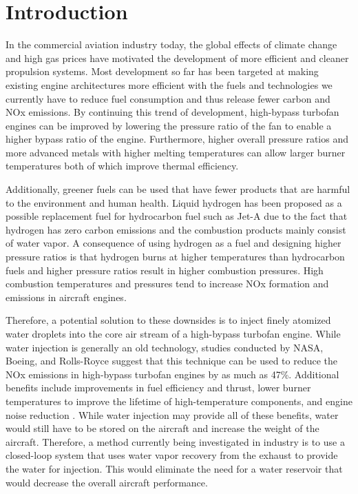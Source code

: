 \documentclass[]{icas2022}
\affil[1]{MSE Student, Department of Aerospace Engineering, University of Michigan}
\affil[2]{Ph.D.~Candidate, Department of Aerospace Engineering, University of Michigan}
\affil[3]{Professor, Department of Aerospace Engineering, University of Michigan}
\begin{document}
\body  %

\section{Introduction}
In the commercial aviation industry today, the global effects of climate change and high gas prices have motivated the development of more efficient and cleaner propulsion systems. 
Most development so far has been targeted at making existing engine architectures more efficient with the fuels and technologies we currently have to reduce fuel consumption and thus release fewer carbon and NOx emissions. 
By continuing this trend of development, high-bypass turbofan engines can be improved by lowering the pressure ratio of the fan to enable a higher bypass ratio of the engine.
Furthermore, higher overall pressure ratios and more advanced metals with higher melting temperatures can allow larger burner temperatures both of which improve thermal efficiency. 

Additionally, greener fuels can be used that have fewer products that are harmful to the environment and human health. 
Liquid hydrogen has been proposed as a possible replacement fuel for hydrocarbon fuel such as Jet-A due to the fact that hydrogen has zero carbon emissions and the combustion products mainly consist of water vapor. 
A consequence of using hydrogen as a fuel and designing higher pressure ratios is that hydrogen burns at higher temperatures than hydrocarbon fuels and higher pressure ratios result in higher combustion pressures. 
High combustion temperatures and pressures tend to increase NOx formation and emissions in aircraft engines.

Therefore, a potential solution to these downsides is to inject finely atomized water droplets into the core air stream of a high-bypass turbofan engine. 
While water injection is generally an old technology, studies conducted by NASA, Boeing, and Rolls-Royce suggest that this technique can be used to reduce the NOx emissions in high-bypass turbofan engines by as much as 47\%. 
Additional benefits include improvements in fuel efficiency and thrust, lower burner temperatures to improve the lifetime of high-temperature components, and engine noise reduction \cite{nasa_inject}. 
While water injection may provide all of these benefits, water would still have to be stored on the aircraft and increase the weight of the aircraft. 
Therefore, a method currently being investigated in industry is to use a closed-loop system that uses water vapor recovery from the exhaust to provide the water for injection. 
This would eliminate the need for a water reservoir that would decrease the overall aircraft performance.
\end{document}
